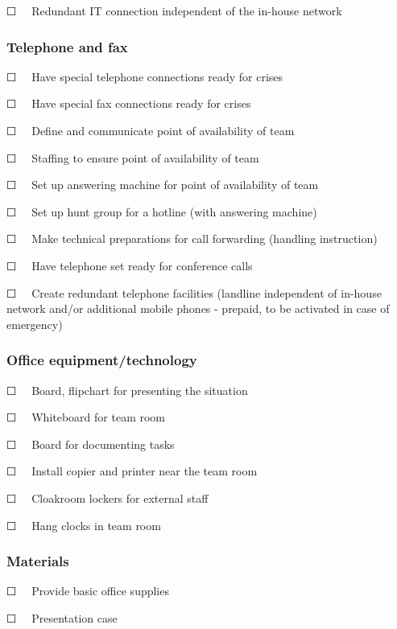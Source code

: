 \documentclass{article}
\begin{document}
☐   Redundant IT connection independent of the in-house network


\subsubsection{Telephone and fax}\label{H9723828}



☐   Have special telephone connections ready for crises


☐   Have special fax connections ready for crises


☐   Define and communicate point of availability of team


☐   Staffing to ensure point of availability of team 


☐   Set up answering machine for point of availability of team


☐   Set up hunt group for a hotline (with answering machine)


☐   Make technical preparations for call forwarding (handling instruction)


☐   Have telephone set ready for conference calls


☐   Create redundant telephone facilities (landline independent of in-house network and/or additional mobile phones - prepaid, to be activated in case of emergency) 


\subsubsection{Office equipment/technology}\label{H4829806}



☐   Board, flipchart for presenting the situation


☐   Whiteboard for team room


☐   Board for documenting tasks


☐   Install copier and printer near the team room


☐   Cloakroom lockers for external staff


☐   Hang clocks in team room


\subsubsection{Materials}\label{H3998633}



☐   Provide basic office supplies


☐   Presentation case
\end{document}

